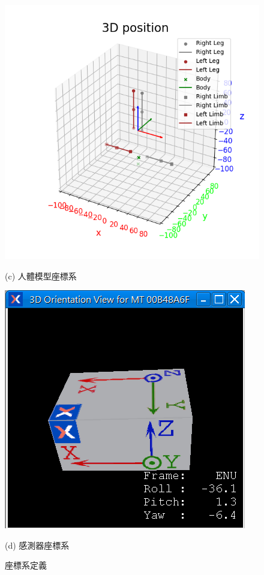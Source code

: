 \begin{figure}[!ht]
\begin{minipage}{.5\textwidth}
     \includegraphics[width=.95\linewidth]{figure/ch3_fig_skeleton_frame.png}
     \caption*{(c) 人體模型座標系}
   \end{minipage}%
   \begin{minipage}{.5\textwidth}
     \centering
     \includegraphics[width=.95\linewidth]{figure/ch3_fig_imu_frame.png}
     \caption*{(d) 感測器座標系}
   \end{minipage}
   \captionsetup{justification=centering}
   \caption[座標系定義]{座標系定義}
   \label{ch3_fig_frame}
\end{figure}

